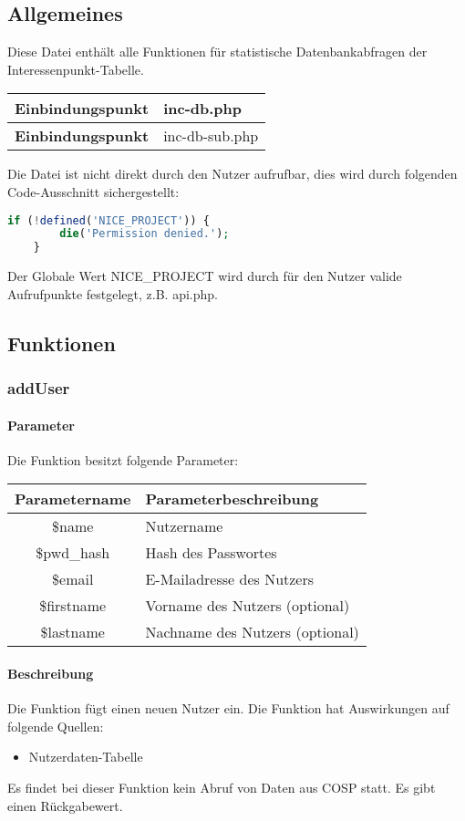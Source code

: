 \subsection{Allgemeines} Diese Datei enthält alle Funktionen für statistische Datenbankabfragen der Interessenpunkt-Tabelle.
\begin{table}[H]
	\begin{tabular}{|c|p{11cm}|}
		\hline
		\textbf{Einbindungspunkt} & inc-db.php \\ \hline
		\textbf{Einbindungspunkt} & inc-db-sub.php \\ \hline
	\end{tabular}
\end{table}
Die Datei ist nicht direkt durch den Nutzer aufrufbar, dies wird durch folgenden Code-Ausschnitt sichergestellt:
\begin{lstlisting}[language=php]
	if (!defined('NICE_PROJECT')) {
		die('Permission denied.');
	}
\end{lstlisting}
Der Globale Wert {\glqq NICE\_PROJECT\grqq} wird durch für den Nutzer valide Aufrufpunkte festgelegt, z.B. {\glqq api.php\grqq}.
\newpage
\subsection{Funktionen}
\subsubsection{addUser}
\paragraph{Parameter} Die Funktion besitzt folgende Parameter:
\begin{table}[H]
	\begin{tabular}{|c|p{11cm}|}
		\hline
		\textbf{Parametername} & \textbf{Parameterbeschreibung} \\ \hline
		\$name      & Nutzername \\ \hline
		\$pwd\_hash & Hash des Passwortes \\ \hline
		\$email     & E-Mailadresse des Nutzers \\ \hline
		\$firstname & Vorname des Nutzers (optional) \\ \hline
		\$lastname  & Nachname des Nutzers (optional) \\ \hline
	\end{tabular}
\end{table}
\paragraph{Beschreibung} Die Funktion fügt einen neuen Nutzer ein. Die Funktion hat Auswirkungen auf folgende Quellen:
\begin{itemize}
	\item Nutzerdaten-Tabelle
\end{itemize}
Es findet bei dieser Funktion kein Abruf von Daten aus {\glqq COSP\grqq} statt. Es gibt einen Rückgabewert.
